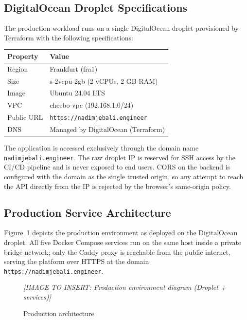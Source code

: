 \documentclass[12pt, a4paper, oneside]{report}
\newcommand{\imagePlaceholder}[2][8cm]{%
  \begin{mdframed}[backgroundcolor=cheebolightgray,linecolor=gray!40]
    \centering
    \vspace{#1}
    \textit{\color{gray}[IMAGE TO INSERT: #2]}
    \vspace{8mm}
  \end{mdframed}
}
\begin{document}
\subsection{DigitalOcean Droplet Specifications}
\label{sec:droplet-specs}

The production workload runs on a single DigitalOcean droplet provisioned by
Terraform with the following specifications:

\begin{center}
\begin{tabular}{ll}
  \toprule
  \textbf{Property} & \textbf{Value} \\
  \midrule
  Region      & Frankfurt (fra1) \\
  Size        & s-2vcpu-2gb (2 vCPUs, 2 GB RAM) \\
  Image       & Ubuntu 24.04 LTS \\
  VPC         & cheebo-vpc (192.168.1.0/24) \\
  Public URL  & \texttt{https://nadimjebali.engineer} \\
  DNS         & Managed by DigitalOcean (Terraform) \\
  \bottomrule
\end{tabular}
\end{center}

The application is accessed exclusively through the domain name
\texttt{nadimjebali.engineer}.  The raw droplet IP is reserved for SSH
access by the CI/CD pipeline and is never exposed to end users.  CORS on
the backend is configured with the domain as the single trusted origin, so
any attempt to reach the API directly from the IP is rejected by the
browser's same-origin policy.

\subsection{Production Service Architecture}

Figure~\ref{fig:production} depicts the production environment as
deployed on the DigitalOcean droplet. All five Docker Compose
services run on the same host inside a private bridge network;
only the Caddy proxy is reachable from the public internet, serving
the platform over HTTPS at the domain
\texttt{https://nadimjebali.engineer}.

\begin{figure}[H]
  \centering
  \imagePlaceholder[7cm]{Production environment diagram (Droplet + services)}
  \caption{Production architecture}
  \label{fig:production}
\end{figure}
\end{document}
